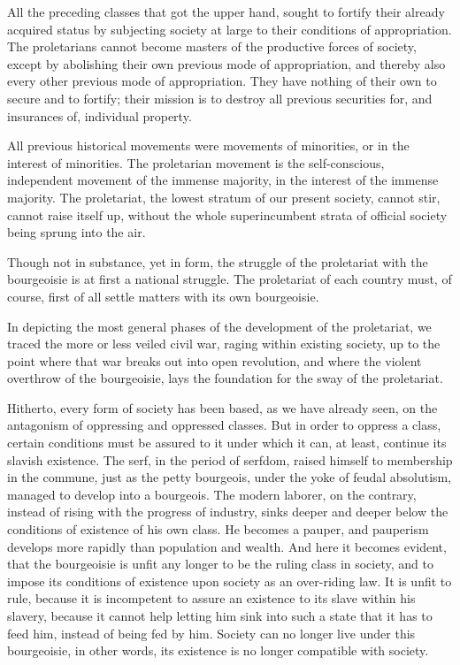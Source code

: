 All the preceding classes that got the upper hand, sought to fortify their already acquired status by subjecting society at large to their conditions of appropriation. The proletarians cannot become masters of the productive forces of society, except by abolishing their own previous mode of appropriation, and thereby also every other previous mode of appropriation. They have nothing of their own to secure and to fortify; their mission is to destroy all previous securities for, and insurances of, individual property.

All previous historical movements were movements of minorities, or in the interest of minorities. The proletarian movement is the self-conscious, independent movement of the immense majority, in the interest of the immense majority. The proletariat, the lowest stratum of our present society, cannot stir, cannot raise itself up, without the whole superincumbent strata of official society being sprung into the air.

Though not in substance, yet in form, the struggle of the proletariat with the bourgeoisie is at first a national struggle. The proletariat of each country must, of course, first of all settle matters with its own bourgeoisie.

In depicting the most general phases of the development of the proletariat, we traced the more or less veiled civil war, raging within existing society, up to the point where that war breaks out into open revolution, and where the violent overthrow of the bourgeoisie, lays the foundation for the sway of the proletariat.

Hitherto, every form of society has been based, as we have already seen, on the antagonism of oppressing and oppressed classes. But in order to oppress a class, certain conditions must be assured to it under which it can, at least, continue its slavish existence. The serf, in the period of serfdom, raised himself to membership in the commune, just as the petty bourgeois, under the yoke of feudal absolutism, managed to develop into a bourgeois. The modern laborer, on the contrary, instead of rising with the progress of industry, sinks deeper and deeper below the conditions of existence of his own class. He becomes a pauper, and pauperism develops more rapidly than population and wealth. And here it becomes evident, that the bourgeoisie is unfit any longer to be the ruling class in society, and to impose its conditions of existence upon society as an over-riding law. It is unfit to rule, because it is incompetent to assure an existence to its slave within his slavery, because it cannot help letting him sink into such a state that it has to feed him, instead of being fed by him. Society can no longer live under this bourgeoisie, in other words, its existence is no longer compatible with society.

